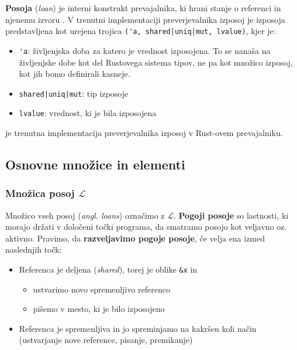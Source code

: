 \documentclass{article}
\begin{document}
\begin{description}
	      \textbf{Posoja} (\textit{loan}) je interni konstrukt prevajalnika, ki hrani stanje o referenci in njenemu izvoru
	      \cite{weissOxideEssenceRust2019}. V trenutni implementaciji preverjevalnika izposoj je izposoja predstavljena kot
	      urejena trojica \cite{2094nllRustRFC} \verb=('a, shared|uniq|mut, lvalue)=, kjer je:
	      \begin{itemize}
		      \item \verb|'a|: življenjska doba za katero je vrednost izposojena. To se nanaša na življenjske dobe kot
		            del Rustovega sistema tipov, ne pa kot množico izposoj, kot jih bomo definirali kasneje.
		      \item \verb=shared|uniq|mut=: tip izposoje
		      \item \verb|lvalue|: vrednost, ki je bila izposojena
	      \end{itemize}
	\item[NLL] je trenutna implementacija preverjevalnika izposoj v Rust-ovem prevajalniku.
\end{description}

\subsection{Osnovne množice in elementi}

\subsubsection{Množica posoj $\mathcal{L}$}

Množico vseh posoj (\textit{angl. loans}) označimo z $\mathcal{L}$. \textbf{Pogoji posoje} so lastnosti, ki morajo
držati v določeni točki programa, da smatramo posojo kot veljavno oz. aktivno.
Pravimo, da \textbf{razveljavimo pogoje posoje}, če velja ena izmed naslednjih točk:
\begin{itemize}
	\item Referenca je deljena (\textit{shared}), torej je oblike \verb|&x| in
	      \begin{itemize}
		      \item ustvarimo novo spremenljivo referenco
		      \item pišemo v mesto, ki je bilo izposojeno
	      \end{itemize}
	\item Referenca je spremenljiva in jo spreminjamo na kakršen koli način (ustvarjanje nove reference, pisanje, premikanje)
\end{itemize}
\end{document}
